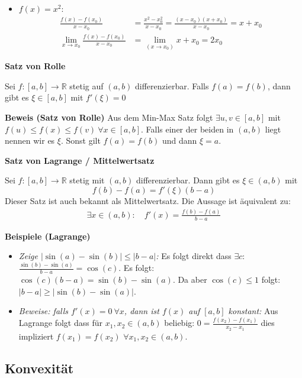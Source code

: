 \documentclass[25pt]{sciposter}
\newcommand{\R}{\mathbb{R}}
\newenvironment{method}[1]{\begin{mdframed}[backgroundcolor=blue!10,innertopmargin=15pt, innerbottommargin=15pt,nobreak=true]
		\textbf{#1 }
	}
	{ 
	\end{mdframed}
}
\begin{document}
\begin{multicols}{3}
\begin{itemize}
	\item $f(x) = x^2$:
	\begin{align*}
		\frac{f(x) - f(x_0)}{x-x_0} &= 	\frac{x^2 - x_{0}^2}{x-x_0} = \frac{(x-x_0) (x+x_0)}{x-x_0} = x + x_0\\
		\lim_{x \to x_0} \frac{f(x)-f(x_0)}{x-x_0} &= \lim_{(x\to x_0)} x + x_0 = 2x_0
	\end{align*}
\end{itemize}



\begin{method}{Satz von Rolle}
	Sei $f: [a,b] \to \R$ stetig auf $(a,b)$ differenzierbar. Falls $f(a) = f(b)$, dann gibt es $\xi \in [a,b]$ mit $f'(\xi) = 0$
\end{method}
\textbf{Beweis (Satz von Rolle)} Aus dem Min-Max Satz folgt $\exists u,v \in [a,b]$ mit $f(u) \leq f(x) \leq f(v) \ \forall x \in [a,b]$. Falls einer der beiden in $(a,b)$ liegt nennen wir es $\xi$. Sonst gilt $f(a) = f(b)$ und dann $\xi = a$.


\begin{method}{Satz von Lagrange / Mittelwertsatz}
	Sei $f:[a,b] \to \R$ stetig mit $(a,b)$ differenzierbar. Dann gibt es $\xi \in (a,b)$ mit $$f(b) - f(a) = f'(\xi) (b-a)$$
	Dieser Satz ist auch bekannt als Mittelwertsatz. Die Aussage ist äquivalent zu: 
	\begin{align*}
		\exists x \in (a,b) : \quad f'(x) = \frac{f(b) -f(a) }{b-a}
	\end{align*}
\end{method}
\textbf{Beispiele (Lagrange)}
\begin{itemize}
	\item \textit{Zeige $|\sin(a) - \sin(b)| \leq |b-a|$:} Es folgt direkt dass $\exists c$: $\frac{\sin(b)- \sin(a)}{b-a} = \cos(c)$. Es folgt: $\cos(c) (b-a) = \sin(b) - \sin(a)$. Da aber $\cos(c) \leq 1$ folgt:
	$|b-a| \geq |\sin(b) - \sin(a)|$.
	\item \textit{Beweise: falls $f'(x) = 0 \ \forall x$, dann ist $f(x)$ auf $[a,b]$ konstant:} Aus Lagrange folgt dass für $x_1,x_2\in (a,b)$ beliebig: $0 = \frac{f(x_2)-f(x_1)}{x_2-x_1}$ dies impliziert $f(x_1) = f(x_2)$ $\forall x_1,x_2 \in (a,b)$.
\end{itemize}

\subsection*{Konvexität}


\end{multicols}
\end{document}
